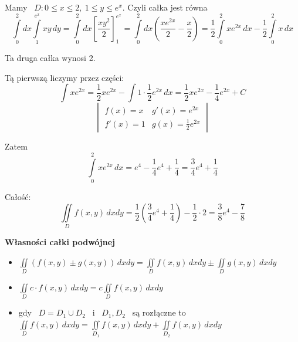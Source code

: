 Mamy \ $ D: 0 \leq x \leq 2, \ 1 \leq y \leq e^x $. Czyli całka jest równa
\[ \int\limits_{0}^{2} dx \int\limits_{1}^{e^x} xy \, dy = \int\limits_{0}^{2} dx \left[ \frac{xy^2}{2} \right]_{1}^{e^x} 
= \int\limits_{0}^{2} dx \left( \frac{xe^{2x}}{2} - \frac{x}{2} \right) = \frac{1}{2} \int\limits_{0}^{2} xe^{2x}\, dx - \frac{1}{2} \int\limits_{0}^{2} x\, dx \]

Ta druga całka wynosi 2.

Tą pierwszą liczymy przez części:
\[ \int xe^{2x} = \frac{1}{2} xe^{2x} - \int 1 \cdot \frac{1}{2} e^{2x} \, dx = \frac{1}{2} xe^{2x} - \frac{1}{4} e^{2x} + C \]
\[ \begin{vmatrix}
    f(x) = x & g'(x) = e^{2x} \\
    f'(x) = 1 & g(x) = \frac{1}{2}e^{2x} 
\end{vmatrix} \]

Zatem
\[ \int\limits_{0}^{2} xe^{2x} \, dx = e^4 - \frac{1}{4}e^4 + \frac{1}{4} = \frac{3}{4}e^4 + \frac{1}{4} \]

Całość:
\[ \iint\limits_D f(x,y) \, dxdy = \frac{1}{2} \left( \frac{3}{4}e^4 + \frac{1}{4} \right) - \frac{1}{2} \cdot 2 = \frac{3}{8}e^4 - \frac{7}{8} \]
\bigskip

\textbf{Własności całki podwójnej}
\begin{itemize}
    \item $ \iint\limits_D \left( f(x,y) \pm g(x,y) \right)\, dxdy = \iint\limits_D f(x,y)\, dxdy \pm \iint\limits_D g(x,y)\, dxdy $
    \item $ \iint\limits_D c \cdot f(x,y)\, dxdy = c \iint\limits_D f(x,y)\, dxdy $
    \item gdy \ $ D = D_1 \cup D_2 $ \ i \ $ D_1, D_2 $ \ są rozłączne to
    $ \iint\limits_D f(x,y)\, dxdy = \iint\limits_{D_1} f(x,y)\, dxdy + \iint\limits_{D_2} f(x,y)\, dxdy $
\end{itemize}